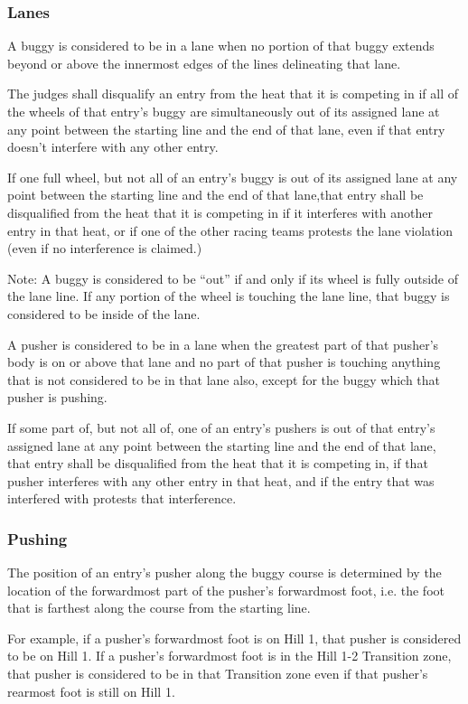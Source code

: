 \subsubsection{Lanes}

	A buggy is considered to be in a lane when no portion of that buggy extends beyond or above the innermost edges of the lines delineating that lane.

	The judges shall disqualify an entry from the heat that it is competing in if all of the wheels of that entry's buggy are simultaneously out of its assigned lane at any point between the starting line and the end of that lane, even if that entry doesn't interfere with any other entry.

	If one full wheel, but not all of an entry's buggy is out of its assigned lane at any point between the starting line and the end of that lane,that entry shall be disqualified from the heat that it is competing in if it interferes with another entry in that heat, or if one of the other racing teams protests the lane violation (even if no interference is claimed.)

    Note: A buggy is considered to be “out” if and only if its wheel is fully outside of the lane line. If any portion of the wheel is touching the lane line, that buggy is considered to be inside of the lane.

	A pusher is considered to be in a lane when the greatest part of that pusher's body is on or above that lane and no part of that pusher is touching anything that is not considered to be in that lane also, except for the buggy which that pusher is pushing.

	If some part of, but not all of, one of an entry's pushers is out of that entry's assigned lane at any point between the starting line and the end of that lane, that entry shall be disqualified from the heat that it is competing in, if that pusher interferes with any other entry in that heat, and if the entry that was interfered with protests that interference.

\subsubsection{Pushing}

	The position of an entry's pusher along the buggy course is determined by the location of the forwardmost part of the pusher's forwardmost foot, i.e. the foot that is farthest along the course from the starting line.

	For example, if a pusher's forwardmost foot is on Hill 1, that pusher is considered to be on Hill 1. If a pusher's forwardmost foot is in the Hill 1-2 Transition zone, that pusher is considered to be in that Transition zone even if that pusher's rearmost foot is still on Hill 1.


